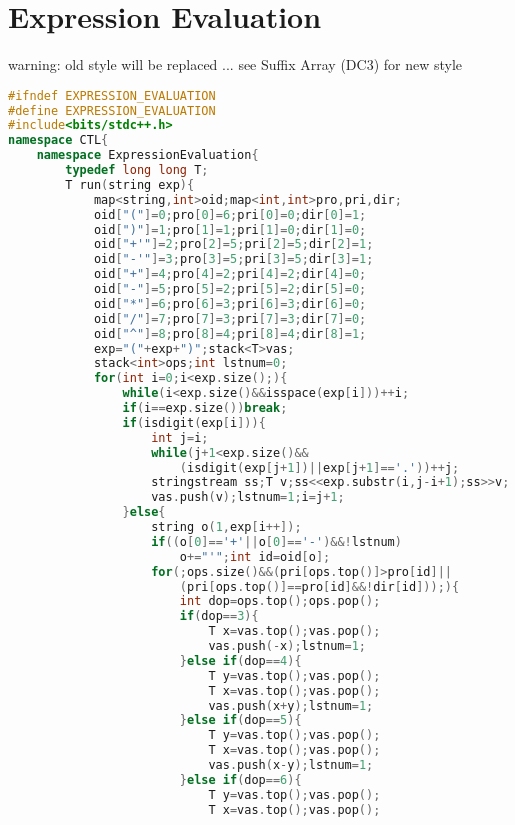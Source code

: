 \documentclass{book}
\begin{document}
\section{Expression Evaluation}
warning: old style will be replaced ... see Suffix Array (DC3) for new style\begin{lstlisting}[language=C++,title={Expression Evaluation.hpp (3275 bytes, 69 lines)}]
#ifndef EXPRESSION_EVALUATION
#define EXPRESSION_EVALUATION
#include<bits/stdc++.h>
namespace CTL{
    namespace ExpressionEvaluation{
        typedef long long T;
        T run(string exp){
            map<string,int>oid;map<int,int>pro,pri,dir;
            oid["("]=0;pro[0]=6;pri[0]=0;dir[0]=1;
            oid[")"]=1;pro[1]=1;pri[1]=0;dir[1]=0;
            oid["+'"]=2;pro[2]=5;pri[2]=5;dir[2]=1;
            oid["-'"]=3;pro[3]=5;pri[3]=5;dir[3]=1;
            oid["+"]=4;pro[4]=2;pri[4]=2;dir[4]=0;
            oid["-"]=5;pro[5]=2;pri[5]=2;dir[5]=0;
            oid["*"]=6;pro[6]=3;pri[6]=3;dir[6]=0;
            oid["/"]=7;pro[7]=3;pri[7]=3;dir[7]=0;
            oid["^"]=8;pro[8]=4;pri[8]=4;dir[8]=1;
            exp="("+exp+")";stack<T>vas;
            stack<int>ops;int lstnum=0;
            for(int i=0;i<exp.size();){
                while(i<exp.size()&&isspace(exp[i]))++i;
                if(i==exp.size())break;
                if(isdigit(exp[i])){
                    int j=i;
                    while(j+1<exp.size()&&
                        (isdigit(exp[j+1])||exp[j+1]=='.'))++j;
                    stringstream ss;T v;ss<<exp.substr(i,j-i+1);ss>>v;
                    vas.push(v);lstnum=1;i=j+1;
                }else{
                    string o(1,exp[i++]);
                    if((o[0]=='+'||o[0]=='-')&&!lstnum)
                        o+="'";int id=oid[o];
                    for(;ops.size()&&(pri[ops.top()]>pro[id]||
                        (pri[ops.top()]==pro[id]&&!dir[id]));){
                        int dop=ops.top();ops.pop();
                        if(dop==3){
                            T x=vas.top();vas.pop();
                            vas.push(-x);lstnum=1;
                        }else if(dop==4){
                            T y=vas.top();vas.pop();
                            T x=vas.top();vas.pop();
                            vas.push(x+y);lstnum=1;
                        }else if(dop==5){
                            T y=vas.top();vas.pop();
                            T x=vas.top();vas.pop();
                            vas.push(x-y);lstnum=1;
                        }else if(dop==6){
                            T y=vas.top();vas.pop();
                            T x=vas.top();vas.pop();

\end{lstlisting}
\end{document}
